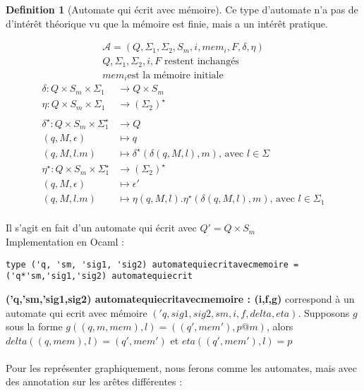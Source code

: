 \documentclass{article}
\theoremstyle{definition}
\newtheorem{definition}{Definition}[section]
\begin{document}
\begin{definition}[Automate qui écrit avec mémoire]
Ce type d'automate n'a pas de d'intérêt théorique vu que la mémoire est finie, mais a un intérêt pratique.

\begin{gather*}
    \mathcal{A} = (Q,\Sigma_1,\Sigma_2, S_m, i, mem_i, F, \delta, \eta) \\
    Q,\Sigma_1,\Sigma_2,i,F \text{ restent inchangés}\\
    mem_i \text{est la m\'emoire initiale}
\end{gather*}
\begin{align*}
    \delta : Q\times S_m \times \Sigma_1 &\rightarrow Q \times S_m \\
    \eta : Q\times S_m \times \Sigma_1&\rightarrow (\Sigma_2 )^\star\\
    \\             
    \delta^\star : Q\times S_m \times \Sigma_1^\star &\rightarrow Q \\
    (q,M,\epsilon) &\mapsto q\\
    (q,M,l.m) &\mapsto \delta^\star(\delta(q,M,l),m)\text{, avec }l\in \Sigma\\
    \eta^\star : Q\times S_m\times \Sigma_1^\star &\rightarrow (\Sigma_2)^\star \\
    (q,M,\epsilon) &\mapsto \epsilon '\\
    (q,M,l.m) &\mapsto \eta(q,M,l).\eta^\star(\delta(q,M,l),m) \text{, avec }l \in \Sigma_1\\
\end{align*}
\end{definition}

Il s'agit en fait d'un automate qui écrit avec $Q' = Q \times S_m$\\
Implementation en Ocaml : \\

\begin{lstlisting}    
type ('q, 'sm, 'sig1, 'sig2) automatequiecritavecmemoire = ('q*'sm,'sig1,'sig2) automatequiecrit
\end{lstlisting}

\textbf{('q,'sm,'sig1,sig2) automatequiecritavecmemoire : (i,f,g)} correspond \`a un automate
qui ecrit avec m\'emoire $('q,sig1,sig2,sm,i,f,delta,eta)$.
Supposons $g$ sous la forme $g((q,m,mem),l) = ((q',mem'),p@m)$,
alors $delta((q,mem),l) = (q',mem')$ et $eta((q',mem'),l) = p$\\\\
Pour les représenter graphiquement, nous ferons comme les automates, mais avec des annotation sur les arêtes différentes :\\
\end{document}
